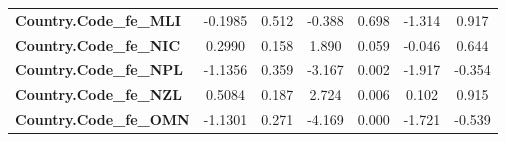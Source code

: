 \begin{center}
\begin{tabular}{lcccccc}
\textbf{Country.Code\_fe\_MLI}                                     &      -0.1985  &        0.512     &    -0.388  &         0.698        &       -1.314    &        0.917     \\
\textbf{Country.Code\_fe\_NIC}                                     &       0.2990  &        0.158     &     1.890  &         0.059        &       -0.046    &        0.644     \\
\textbf{Country.Code\_fe\_NPL}                                     &      -1.1356  &        0.359     &    -3.167  &         0.002        &       -1.917    &       -0.354     \\
\textbf{Country.Code\_fe\_NZL}                                     &       0.5084  &        0.187     &     2.724  &         0.006        &        0.102    &        0.915     \\
\textbf{Country.Code\_fe\_OMN}                                     &      -1.1301  &        0.271     &    -4.169  &         0.000        &       -1.721    &       -0.539     \\
\bottomrule
\end{tabular}
\end{center}